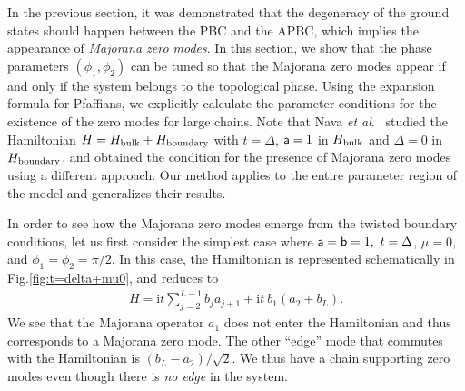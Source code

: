 \documentclass[aps, prb, showpacs, twocolumn, %
amssymb,superscriptaddress]{revtex4}
\newcommand{\ii}{\text{i}}
\begin{document}
In the previous section, it was demonstrated that the degeneracy of the ground states should happen between the PBC and the APBC, which implies the appearance of \textit{Majorana zero modes}. In this section, we show that the phase parameters $\left( \phi_{1},\phi_{2} \right)$ can be tuned so that the Majorana zero modes appear if and only if the system belongs to the topological phase. Using the expansion formula for Pfaffians, we explicitly calculate the parameter conditions for the existence of the zero modes for large chains. Note that Nava {\it et al}.~\cite{Giuliano-16} studied the Hamiltonian $H = H_{\rm bulk}+H_{\rm boundary}$ with $t=\Delta$, ${\sf a}=1$ in $H_{\rm bulk}$ and $\Delta=0$ in $H_{\rm boundary}$, and obtained the condition for the presence of Majorana zero modes using a different approach. Our method applies to the entire parameter region of the model and generalizes their results. 


In order to see how the Majorana zero modes emerge from the twisted boundary conditions, let us first consider the simplest case where ${\sf a}={\sf b}=1,~t=\Delta$, $\mu=0$, and $\phi_1=\phi_2=\pi/2$. In this case, the Hamiltonian is represented schematically in Fig.\ref{fig:t=delta+mu0}, and reduces to
\begin{align}
H = \ii t \sum_{j=2}^{L-1} b_{j} a_{j+1} + 
\ii t~b_{1} \left( a_{2} + b_{L} \right).
\end{align}
We see that the Majorana operator $a_{1}$ does not enter the Hamiltonian and thus corresponds to a Majorana zero mode. The other ``edge'' mode that commutes with the Hamiltonian is $\left( b_{L} - a_{2} \right) / \sqrt{2}$. We thus have a chain supporting zero modes even though there is \textit{no edge} in the system.
\end{document}
